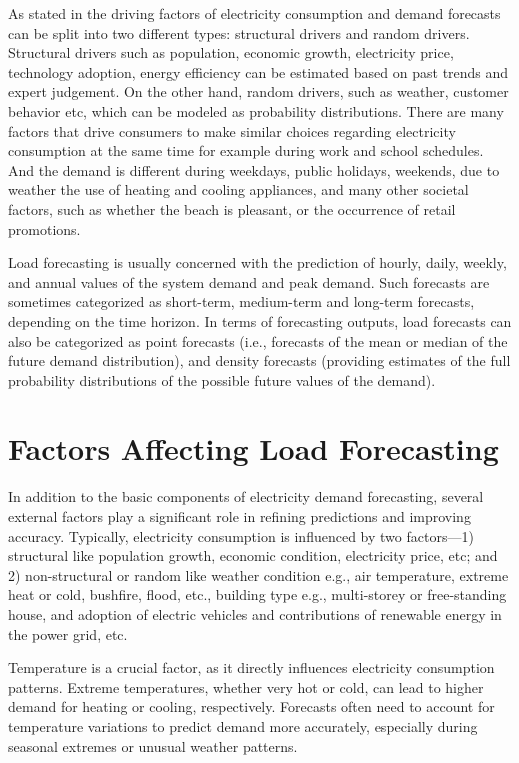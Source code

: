 \documentclass[mstat,12pt]{unswthesis}
\begin{document}
As stated in \cite{nswEnergyConsumption} the driving factors of
electricity consumption and demand forecasts can be split into two
different types: structural drivers and random drivers. Structural
drivers such as population, economic growth, electricity price,
technology adoption, energy efficiency can be estimated based on past
trends and expert judgement. On the other hand, random drivers, such as
weather, customer behavior etc, which can be modeled as probability
distributions. There are many factors that drive consumers to make
similar choices regarding electricity consumption at the same time for
example during work and school schedules. And the demand is different
during weekdays, public holidays, weekends, due to weather the use of
heating and cooling appliances, and many other societal factors, such as
whether the beach is pleasant, or the occurrence of retail promotions.

Load forecasting is usually concerned with the prediction of hourly,
daily, weekly, and annual values of the system demand and peak demand.
Such forecasts are sometimes categorized as short-term, medium-term and
long-term forecasts, depending on the time horizon. In terms of
forecasting outputs, load forecasts can also be categorized as point
forecasts (i.e., forecasts of the mean or median of the future demand
distribution), and density forecasts (providing estimates of the full
probability distributions of the possible future values of the demand).

\section{Factors Affecting Load
Forecasting}\label{factors-affecting-load-forecasting}

In addition to the basic components of electricity demand forecasting,
several external factors play a significant role in refining predictions
and improving accuracy. Typically, electricity consumption is influenced
by two factors---1) structural like population growth, economic
condition, electricity price, etc; and 2) non-structural or random like
weather condition e.g., air temperature, extreme heat or cold, bushfire,
flood, etc., building type e.g., multi-storey or free-standing house,
and adoption of electric vehicles and contributions of renewable energy
in the power grid, etc.

Temperature is a crucial factor, as it directly influences electricity
consumption patterns. Extreme temperatures, whether very hot or cold,
can lead to higher demand for heating or cooling, respectively.
Forecasts often need to account for temperature variations to predict
demand more accurately, especially during seasonal extremes or unusual
weather patterns.
\end{document}
